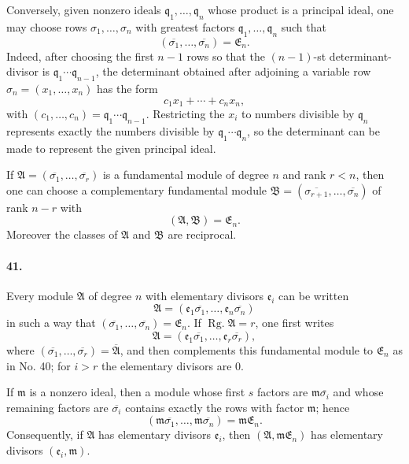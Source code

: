 \documentclass[11pt]{article}
\newcommand{\Rg}{\operatorname{Rg.}}
\begin{document}
Conversely, given nonzero ideals $\mathfrak q_1,
\ldots,
\mathfrak q_n$ whose product is a principal ideal, one may choose rows $\sigma_1,
\ldots,
\sigma_n$ with greatest factors $\mathfrak q_1,
\ldots,
\mathfrak q_n$ such that
\[
(\overline{\sigma_1},
\ldots,
\overline{\sigma_n})=\mathfrak E_n.
\]
Indeed, after choosing the first $n-1$ rows so that the $(n-1)$-st determinant-divisor is $\mathfrak q_1\cdots\mathfrak q_{n-1}$, the determinant obtained after adjoining a variable row $\sigma_n=(x_1,
\ldots,
 x_n)$ has the form
\begin{equation}
 c_1x_1+
\cdots+c_nx_n,
\tag{53}
\end{equation}
with $(c_1,
\ldots,
 c_n)=\mathfrak q_1\cdots\mathfrak q_{n-1}$. Restricting the $x_i$ to numbers divisible by $\mathfrak q_n$ represents exactly the numbers divisible by $\mathfrak q_1\cdots\mathfrak q_n$, so the determinant can be made to represent the given principal ideal.

If $\mathfrak A=(\overline{\sigma_1},
\ldots,
\overline{\sigma_r})$ is a fundamental module of degree $n$ and rank $r<n$, then one can choose a complementary fundamental module $\mathfrak B=(\overline{\sigma_{r+1}},
\ldots,
\overline{\sigma_n})$ of rank $n-r$ with
\[
(\mathfrak A,
\mathfrak B)=\mathfrak E_n.
\]
Moreover the classes of $\mathfrak A$ and $\mathfrak B$ are reciprocal.

\paragraph{41.}
Every module $\mathfrak A$ of degree $n$ with elementary divisors $\mathfrak e_i$ can be written
\begin{equation}
\mathfrak A=(\mathfrak e_1\overline{\sigma_1},
\ldots,
\mathfrak e_n\overline{\sigma_n})
\tag{54}
\end{equation}
in such a way that $(\overline{\sigma_1},
\ldots,
\overline{\sigma_n})=\mathfrak E_n$. If $\Rg\mathfrak A=r$, one first writes
\begin{equation}
\mathfrak A=(\mathfrak e_1\overline{\sigma_1},
\ldots,
\mathfrak e_r\overline{\sigma_r}),
\tag{55}
\end{equation}
where $(\overline{\sigma_1},
\ldots,
\overline{\sigma_r})=\overline{\mathfrak A}$, and then complements this fundamental module to $\mathfrak E_n$ as in No. 40; for $i>r$ the elementary divisors are $0$.

If $\mathfrak m$ is a nonzero ideal, then a module whose first $s$ factors are $\mathfrak m\overline{\sigma_i}$ and whose remaining factors are $\overline{\sigma_i}$ contains exactly the rows with factor $\mathfrak m$; hence
\[
(\mathfrak m\overline{\sigma_1},
\ldots,
\mathfrak m\overline{\sigma_n})=\mathfrak m\mathfrak E_n.
\]
Consequently, if $\mathfrak A$ has elementary divisors $\mathfrak e_i$, then $(\mathfrak A,
\mathfrak m\mathfrak E_n)$ has elementary divisors $(\mathfrak e_i,
\mathfrak m)$.
\end{document}
